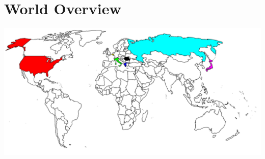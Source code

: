 \documentclass[12pt]{article}
\begin{document}
\section{World Overview}
\centerline{\includegraphics[width=6.85in]{World_Map}}
\end{document}
